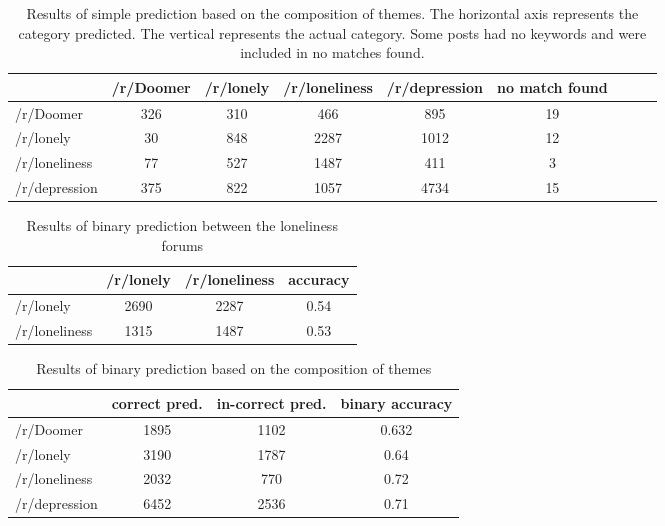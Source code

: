 \documentclass[../report.tex]{subfiles}
\begin{document}
\begin{table*}[ht]
    \centering
   \begin{tabular}{| l | c | c |c | c | c | c | c | c |}
    \toprule
    {} & /r/Doomer & /r/lonely & /r/loneliness & /r/depression & no match found \\ 
    \midrule
 /r/Doomer & 326 & 310 & 466 & 895 & 19 \\ 
 /r/lonely & 30 & 848 & 2287 & 1012 & 12 \\ 
/r/loneliness & 77 & 527 & 1487 & 411 & 3 \\
/r/depression & 375 & 822 & 1057 & 4734 & 15 \\

    \bottomrule
   \end{tabular} 

   \caption{Results of simple prediction based on the composition of themes. The horizontal axis represents the category predicted. The vertical represents the actual category. Some posts had no keywords and were included in no matches found.}
   \label{tab:pred_results}
\end{table*}

\begin{table*}[ht]
    \centering
   \begin{tabular}{| l | c | c |c |}
    \toprule
    {} & /r/lonely & /r/loneliness & accuracy \\ 
    \midrule
/r/lonely & 2690 & 2287 & 0.54 \\
/r/loneliness & 1315 & 1487 & 0.53 \\
    \bottomrule
   \end{tabular}

   \caption{Results of binary prediction between the loneliness forums}
   \label{tab:loneliness_pred_results}
\end{table*}

\begin{table}[H]
    \centering
   \begin{tabular}{| l | c | c |c |}
    \toprule
    {} & \multicolumn{1}{p{1cm}|}{correct pred.} & \multicolumn{1}{p{1cm}|}{in-correct pred.} & \multicolumn{1}{p{1cm}|}{binary accuracy} \\
    \midrule
 /r/Doomer & 1895 & 1102 & 0.632\\ 
 /r/lonely & 3190 & 1787 & 0.64\\ 
/r/loneliness & 2032 & 770 & 0.72\\
/r/depression & 6452 & 2536 & 0.71 \\
    \bottomrule
   \end{tabular}

   \caption{Results of binary prediction based on the composition of themes}
   \label{tab:binary_pred_results}
\end{table}
\end{document}
